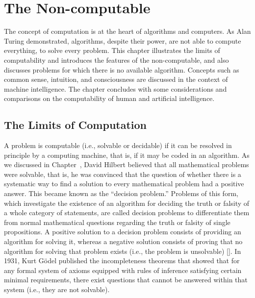 




%

\setcounter{chapter}{10}

\chapter{\label{chap:11}The Non-computable}

{The concept of computation is at the heart of algorithms and computers. As Alan Turing demonstrated, algorithms, despite their power, are not able to compute everything, to solve every problem. This chapter illustrates the limits of computability and introduces the features of the non-computable, and also discusses problems for which there is no available algorithm. Concepts such as common sense, intuition, and consciousness are discussed in the context of machine intelligence. The chapter concludes with some considerations and comparisons on the computability of human and artificial intelligence.}

\section{\label{sec:11.1}The Limits of Computation}

A problem is computable (i.e., solvable or decidable) if it can be resolved in principle by a computing machine, that is, if it may be coded in an algorithm. As we discussed in Chapter~, David Hilbert believed that all mathematical problems were solvable, that is, he was convinced that the question of whether there is a systematic way to find a solution to every mathematical problem had a positive answer. This became known as the ``decision problem.'' Problems of this form, which investigate the existence of an algorithm for deciding the truth or falsity of a whole category of statements, are called decision problems to differentiate them from normal mathematical questions regarding the truth or falsity of single propositions. A positive solution to a decision problem consists of providing an algorithm for solving it, whereas a negative solution consists of proving that no algorithm for solving that problem exists (i.e., the problem is unsolvable) [\citealt{chap:11:Martin:1958}]. In 1931, Kurt G\"{o}del published the incompleteness theorems that showed that for any formal system of axioms equipped with rules of inference satisfying certain minimal requirements, there exist questions that cannot be answered within that system (i.e., they are not solvable).

